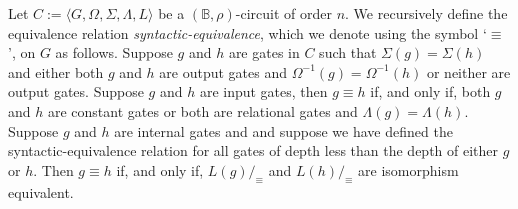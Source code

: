 \documentclass[../paper.tex]{subfiles}
\begin{document}



\begin{definition}
  Let $C := \langle G, \Omega, \Sigma, \Lambda, L \rangle$ be a $(\mathbb{B},
  \rho)$-circuit of order $n$. We recursively define the equivalence relation
  \emph{syntactic-equivalence}, which we denote using the symbol `$\equiv$', on
  $G$ as follows. Suppose $g$ and $h$ are gates in $C$ such that $\Sigma (g) =
  \Sigma(h)$ and either both $g$ and $h$ are output gates and $\Omega^{-1}(g) =
  \Omega^{-1}(h)$ or neither are output gates. Suppose $g$ and $h$ are input
  gates, then $g \equiv h$ if, and only if, both $g$ and $h$ are constant gates
  or both are relational gates and $\Lambda(g) = \Lambda (h)$. Suppose $g$ and
  $h$ are internal gates and and suppose we have defined the
  syntactic-equivalence relation for all gates of depth less than the depth of
  either $g$ or $h$. Then $g \equiv h$ if, and only if, $L(g) /_\equiv$ and
  $L(h) /_\equiv$ are isomorphism equivalent.
\end{definition}
\end{document}
